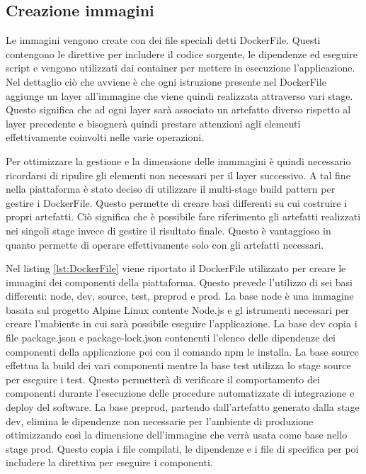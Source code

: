 \subsection{Creazione immagini}

Le immagini vengono create con dei file speciali detti DockerFile.
Questi contengono le direttive per includere il codice sorgente, le dipendenze ed eseguire script e vengono utilizzati
dai container per mettere in esecuzione l'applicazione. Nel dettaglio ciò che avviene è che ogni istruzione
presente nel DockerFile aggiunge un layer all'immagine che viene quindi realizzata attraverso vari stage.
Questo significa che ad ogni layer sarà associato un artefatto diverso rispetto al layer precedente e bisognerà
quindi prestare attenzioni agli elementi effettivamente coinvolti nelle varie operazioni.

Per ottimizzare la gestione e la dimensione delle immmagini è quindi necessario ricordarsi di ripulire gli
elementi non necessari per il layer successivo. A tal fine nella piattaforma è stato deciso di
utilizzare il multi-stage build pattern per gestire i DockerFile. Questo permette di creare basi
differenti su cui costruire i propri artefatti. Ciò significa che è possibile
fare riferimento gli artefatti realizzati nei singoli stage invece di gestire il risultato finale.
Questo è vantaggioso in quanto permette di operare effettivamente solo con gli artefatti necessari.

Nel listing \ref{lst:DockerFile} viene riportato il DockerFile utilizzato per creare le immagini dei componenti della piattaforma.
Questo prevede l'utilizzo di sei basi differenti: node, dev, source, test, preprod e prod.
La base node è una immagine basata sul progetto Alpine Linux contente Node.js e gl istrumenti necessari per
creare l'mabiente in cui sarà possibile eseguire l'applicazione. La base dev copia i file package.json e package-lock.json
contenenti l'elenco delle dipendenze dei componenti della applicazione poi con il comando npm le installa.
La base source effettua la build dei vari componenti mentre la base test utilizza lo stage source per eseguire i test.
Questo permetterà di verificare il comportamento dei componenti durante l'esecuzione delle procedure automatizzate di integrazione
e deploy del software. La base preprod, partendo dall'artefatto generato dalla stage dev, elimina le dipendenze non necessarie per l'ambiente
di produzione ottimizzando così la dimensione dell'immagine che verrà usata come base nello stage prod.
Questo copia i file compilati, le dipendenze e i file di specifica per poi includere la direttiva per eseguire i componenti.

